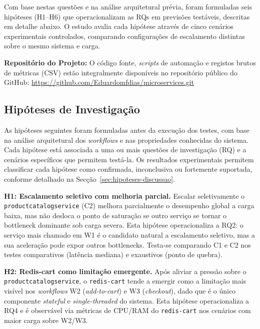 \documentclass[manuscript,oneside]{acmart}
\begin{document}
Com base nestas questões e na análise arquitetural prévia, foram formuladas seis hipóteses (H1--H6) que operacionalizam as RQs em previsões testáveis, descritas em detalhe abaixo. O estudo avalia cada hipótese através de cinco cenários experimentais controlados, comparando configurações de escalamento distintas sobre o mesmo sistema e carga.

\vspace{0.3cm}
\noindent\textbf{Repositório do Projeto:} O código fonte, \textit{scripts} de automação e registos brutos de métricas (CSV) estão integralmente disponíveis no repositório público do GitHub: \url{https://github.com/Eduardomfdias/microservices.git}
\vspace{0.3cm}

\subsection{Hipóteses de Investigação}
\label{subsec:hipoteses}

As hipóteses seguintes foram formuladas antes da execução dos testes, com base na análise arquitetural dos \textit{workflows} e nas propriedades conhecidas do sistema. Cada hipótese está associada a uma ou mais questões de investigação (RQ) e a cenários específicos que permitem testá-la. Os resultados experimentais permitem classificar cada hipótese como confirmada, inconclusiva ou fortemente suportada, conforme detalhado na Secção~\ref{sec:hipoteses-discussao}.

\textbf{H1: Escalamento seletivo com melhoria parcial.} Escalar seletivamente o \texttt{productcatalogservice} (C2) melhora parcialmente o desempenho global a carga baixa, mas não desloca o ponto de saturação se outro serviço se tornar o bottleneck dominante sob carga severa. Esta hipótese operacionaliza a RQ2: o serviço mais chamado em W1 é o candidato natural a escalamento seletivo, mas a sua aceleração pode expor outros bottlenecks. Testa-se comparando C1 e C2 nos testes comparativos (latência mediana) e exaustivos (ponto de quebra).

\textbf{H2: Redis-cart como limitação emergente.} Após aliviar a pressão sobre o \texttt{productcatalogservice}, o \texttt{redis-cart} tende a emergir como a limitação mais visível nos \textit{workflows} W2 (\textit{add-to-cart}) e W3 (\textit{checkout}), dado que é o único componente \textit{stateful} e \textit{single-threaded} do sistema. Esta hipótese operacionaliza a RQ4 e é observável via métricas de CPU/RAM do \texttt{redis-cart} nos cenários com maior carga sobre W2/W3.
\end{document}
